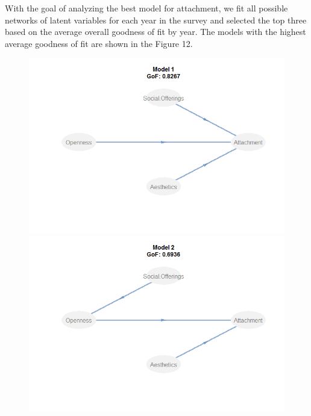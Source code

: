 \documentclass[11pt]{asaproc}
\begin{document}
With the goal of analyzing the best model for attachment, we fit all
possible networks of latent variables for each year in the survey and
selected the top three based on the average overall goodness of fit by
year. The models with the highest average goodness of fit are shown in
the Figure 12. 

\begin{figure}[H]
\begin{framed}
\begin{minipage}[b]{0.45\linewidth}
\centering
\includegraphics[width=\textwidth]{Mod1GoF.png}
\end{minipage}
\hspace{0.5cm}
\begin{minipage}[b]{0.45\linewidth}
\centering
\includegraphics[width=\textwidth]{Mod2GoF.png}
\end{minipage}

\end{framed}
\end{figure}
\end{document}
